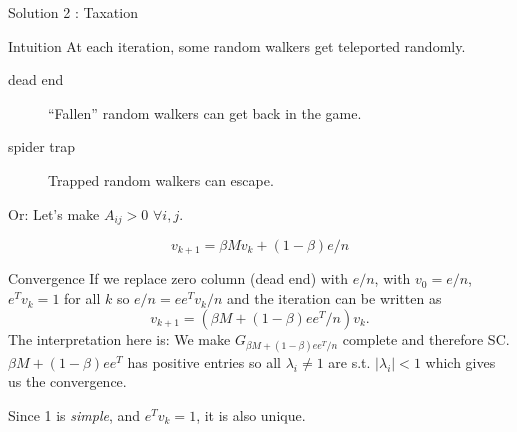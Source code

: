 \documentclass[10pt]{beamer}
\begin{document}
\begin{frame}[allowframebreaks]{Solution 2 : Taxation}
  \begin{block}{Intuition}
    At each iteration, some random walkers get teleported randomly.
    \begin{description}
      \item[dead end] ``Fallen'' random walkers can get back in the game.
      \item[spider trap] Trapped random walkers can escape.
    \end{description}

    Or: Let's make $A_{ij} > 0$ $\forall i,j$. %
  \end{block}
  $$v_{k+1} = \beta M v_k + (1 - \beta) e/n$$
  \begin{block}{Convergence}
    If we replace zero column (dead end) with $e/n$, with $v_0 = e/n$, $e^T v_k = 1$ for all $k$
    so $e/n = ee^Tv_k/n$ and the iteration can be written as
    $$v_{k+1} = (\beta M + (1 - \beta) ee^T/n) v_k.$$
    The interpretation here is: We make $G_{\beta M + (1 - \beta) ee^T/n}$ complete and therefore SC.
    $\beta M + (1-\beta) ee^T$ has positive entries so all $\lambda_i \neq 1$ are s.t. $|\lambda_i| < 1$
    which gives us the convergence.

    Since 1 is \emph{simple}, and $e^T v_k = 1$, it is also unique.
  \end{block}

\end{frame}
\end{document}

